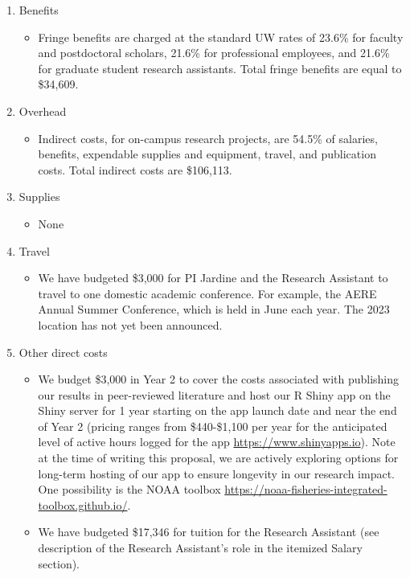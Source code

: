 \begin{enumerate}
\begin{itemize}
\end{itemize}
\item Benefits
\begin{itemize}
\item Fringe benefits are charged at the standard UW rates of 23.6\% for faculty and postdoctoral scholars, 21.6\% for professional employees, and 21.6\% for graduate student research assistants. Total fringe benefits are equal to \$34,609.
\end{itemize}
\item Overhead
\begin{itemize}
\item Indirect costs, for on-campus research projects, are 54.5\% of salaries, benefits, expendable supplies and equipment, travel, and publication costs. Total indirect costs are \$106,113.
\end{itemize}
\item Supplies
\begin{itemize}
\item None
\end{itemize}
\item Travel
\begin{itemize}
\item We have budgeted \$3,000 for PI Jardine and the Research Assistant to travel to one domestic academic conference. For example, the AERE Annual Summer Conference, which is held in June each year. The 2023 location has not yet been announced.
\end{itemize}
\item Other direct costs
\begin{itemize}
\item We budget \$3,000 in Year 2 to cover the costs associated with publishing our results in peer-reviewed literature and host our R Shiny app on the Shiny server for 1 year starting on the app launch date and near the end of Year 2 (pricing ranges from \$440-\$1,100 per year for the anticipated level of active hours logged for the app \url{https://www.shinyapps.io}). Note at the time of writing this proposal, we are actively exploring options for long-term hosting of our app to ensure longevity in our research impact. One possibility is the NOAA toolbox \url{https://noaa-fisheries-integrated-toolbox.github.io/}.
\item We have budgeted \$17,346 for tuition for the Research Assistant (see description of the Research Assistant's role in the itemized Salary section).

\end{itemize}
\end{enumerate}
